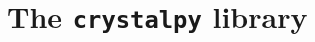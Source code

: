 \documentclass[preprint]{iucr}              %
\newcommand{\inblue}[1]{{\color{blue}#1}}
\begin{document}










%
\section{The {\tt crystalpy} library}
\label{sec:crystalpy}
\end{document}
